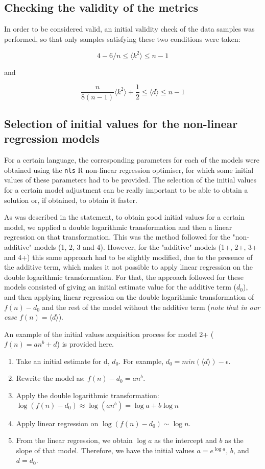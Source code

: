 \subsection{Checking the validity of the metrics}

In order to be considered valid, an initial validity check of the data samples was performed, so that only samples satisfying these two conditions were taken:

$$4-6/n \leq \langle k^2 \rangle \leq n-1$$

and

$$\frac{n}{8(n-1)}\langle k^2 \rangle + \frac{1}{2} \leq \langle d \rangle \leq n-1$$

\subsection{Selection of initial values for the non-linear regression models \label{subsec:initial_values}}

For a certain language, the corresponding parameters for each of the models were obtained using the \verb|nls| R
non-linear regression optimiser, for which some initial values of these parameters had to be provided. The selection of the initial values for a certain model adjustment can be really important to be able to obtain a solution or, if obtained, to obtain it faster. 

As was described in the statement, to obtain good initial values for a certain model, we applied a double logarithmic transformation and then a linear regression on that transformation. This was the method followed for the "non-additive" models (1, 2, 3 and 4). However, for the "additive" models (1+, 2+, 3+ and 4+) this same approach had to be slightly modified, due to the presence of the additive term, which makes it not possible to apply linear regression on the double logarithmic transformation. 
For that, the approach followed for these models consisted of giving an initial estimate value for the additive term ($d_0$), and then applying linear regression on the double logarithmic transformation of $f(n)-d_0$ and the rest of the model without the additive term (\textit{note that in our case $f(n) = \langle d \rangle$}).

An example of the initial values acquisition process for model 2+ ($f(n)=an^b + d$) is provided here.

\begin{enumerate}
    \item Take an initial estimate for d, $d_0$. For example, $d_0 = min(\langle d \rangle) - \epsilon$.
    \item Rewrite the model as: $f(n)-d_0=an^b$.
    \item Apply the double logarithmic transformation: $\log(f(n)-d_0) \approx \log(an^b) = \log a + b\log n$
    \item Apply linear regression on $\log(f(n)-d_0) \sim \log n$.
    \item From the linear regression, we obtain $\log a$ as the intercept and $b$ as the slope of that model. Therefore, we have the initial values $a = e^{\log a}$, $b$, and $d = d_0$.
\end{enumerate}

